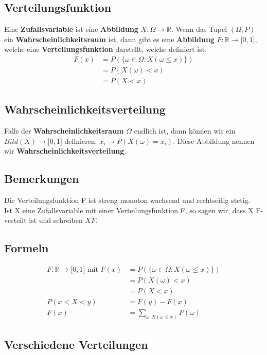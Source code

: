 \documentclass[a4paper]{article}
\begin{document}
	\subsection{Verteilungsfunktion}
		Eine \textbf{Zufallsvariable} ist eine \textbf{Abbildung} $X: \Omega \rightarrow \mathbb{R}$. Wenn das Tupel $(\Omega, P)$ ein \textbf{Wahrscheinlichkeitsraum} ist, dann gibt es eine \textbf{Abbildung} $F: \mathbb{R} \rightarrow {[}0, 1{]}$, welche eine \textbf{Verteilungsfunktion} darstellt, welche definiert ist: 
		\begin{align*}
			F(x) &= P(\{\omega \in \Omega : X(\omega \leq x)\}) \\
			&= P(X(\omega) < x)\\
			&= P(X < x)
		\end{align*}
	\subsection{Wahrscheinlichkeitsverteilung}
		Falls der \textbf{Wahrscheinlichkeitsraum }$\Omega$ endlich ist, dann können wir ein $Bild(X) \rightarrow {[}0, 1{]}$ definieren: $x_i \rightarrow P(X(\omega) = x_i)$. Diese Abbildung nennen wir \textbf{Wahrscheinlichkeitsverteilung}.
		
	\subsection{Bemerkungen}
		Die Verteilungsfunktion F ist streng monoton wachsend und rechtseitig stetig.
		\\
		Ist X eine Zufallsvariable mit einer Verteilungsfunktion F, so sagen wir, dass X F-verteilt ist und schreiben $X F$.
	\subsection{Formeln}
		\begin{align*}
			F: \mathbb{R} \rightarrow {[}0, 1{]} \text{ mit } F(x) &= P(\{\omega \in \Omega : X(\omega \leq x)\}) \\
			&= P(X(\omega) < x) \\
			&= P(X < x)\\
			P(x < X < y) &= F(y) - F(x)\\
			F(x) &= \sum_{\omega: X(\omega \leq x) } P(\omega)
		\end{align*}
	\subsection{Verschiedene Verteilungen}
\end{document}
